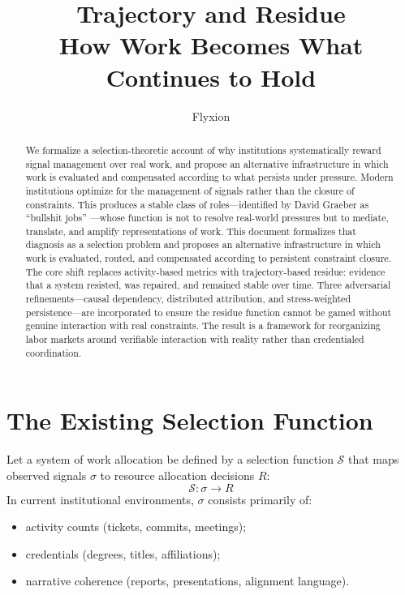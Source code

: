 \documentclass[12pt]{article}
\title{\textbf{Trajectory and Residue}\\[0.5em]
\large How Work Becomes What Continues to Hold}
\author{Flyxion}
\date{}
\begin{document}
\maketitle

\begin{abstract}
We formalize a selection-theoretic account of why institutions
systematically reward signal management over real work, and propose an
alternative infrastructure in which work is evaluated and compensated
according to what persists under pressure. Modern institutions optimize
for the management of signals rather than the closure of constraints.
This produces a stable class of
roles---identified by David Graeber as ``bullshit jobs'' \cite{graeber2018}---whose
function is not to resolve real-world pressures but to mediate,
translate, and amplify representations of work. This document
formalizes that diagnosis as a selection problem and proposes an
alternative infrastructure in which work is evaluated, routed, and
compensated according to persistent constraint closure. The core shift
replaces activity-based metrics with trajectory-based residue: evidence
that a system resisted, was repaired, and remained stable over time.
Three adversarial refinements---causal dependency, distributed
attribution, and stress-weighted persistence---are incorporated to
ensure the residue function cannot be gamed without genuine interaction
with real constraints. The result is a framework for reorganizing labor
markets around verifiable interaction with reality rather than
credentialed coordination.
\end{abstract}

\section{The Existing Selection Function}

Let a system of work allocation be defined by a selection function
$\mathcal{S}$ that maps observed signals $\sigma$ to resource allocation
decisions $R$:
\[
  \mathcal{S} : \sigma \rightarrow R
\]
In current institutional environments, $\sigma$ consists primarily of:
\begin{itemize}
  \item activity counts (tickets, commits, meetings);
  \item credentials (degrees, titles, affiliations);
  \item narrative coherence (reports, presentations, alignment language).
\end{itemize}
\end{document}
